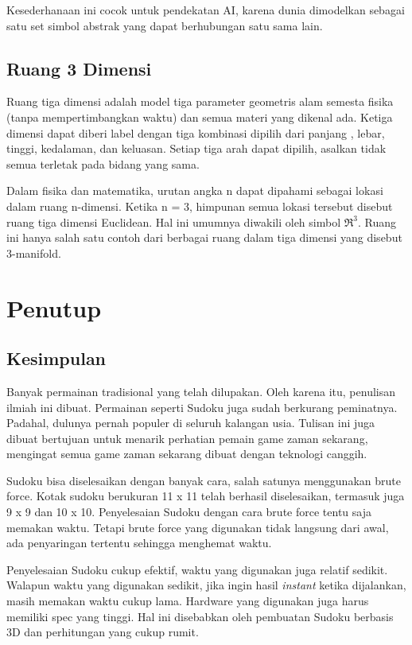 \documentclass[11pt,a4paper]{report}
\begin{document}
Kesederhanaan ini cocok untuk pendekatan AI, karena dunia dimodelkan sebagai satu set simbol abstrak yang dapat berhubungan satu sama lain.

\section{Ruang 3 Dimensi}
Ruang tiga dimensi adalah model tiga parameter geometris alam semesta fisika (tanpa mempertimbangkan waktu) dan semua materi yang dikenal ada. Ketiga dimensi dapat diberi label dengan tiga kombinasi dipilih dari panjang , lebar, tinggi, kedalaman, dan keluasan. Setiap tiga arah dapat dipilih, asalkan tidak semua terletak pada bidang yang sama.

Dalam fisika dan matematika, urutan angka n dapat dipahami sebagai lokasi dalam ruang n-dimensi. Ketika n = 3, himpunan semua lokasi tersebut disebut ruang tiga dimensi Euclidean. Hal ini umumnya diwakili oleh simbol $\Re^3$. Ruang ini hanya salah satu contoh dari berbagai ruang dalam tiga dimensi yang disebut 3-manifold.

\chapter{Penutup} %
\section{Kesimpulan}
\indent Banyak permainan tradisional yang telah dilupakan. Oleh karena itu, penulisan ilmiah ini dibuat. Permainan seperti Sudoku juga sudah berkurang peminatnya. Padahal, dulunya pernah populer di seluruh kalangan usia. Tulisan ini juga dibuat bertujuan untuk menarik perhatian pemain game zaman sekarang, mengingat semua game zaman sekarang dibuat dengan teknologi canggih.

\indent Sudoku bisa diselesaikan dengan banyak cara, salah satunya menggunakan brute force. Kotak sudoku berukuran 11 x 11 telah berhasil diselesaikan, termasuk juga 9 x 9 dan 10 x 10. Penyelesaian Sudoku dengan cara brute force tentu saja memakan waktu. Tetapi brute force yang digunakan tidak langsung dari awal, ada penyaringan tertentu sehingga menghemat waktu.

\indent Penyelesaian Sudoku cukup efektif, waktu yang digunakan juga relatif sedikit. Walapun waktu yang digunakan sedikit, jika ingin hasil \textit{instant} ketika dijalankan, masih memakan waktu cukup lama. Hardware yang digunakan juga harus memiliki spec yang tinggi. Hal ini disebabkan oleh pembuatan Sudoku berbasis 3D dan perhitungan yang cukup rumit.
\end{document}

